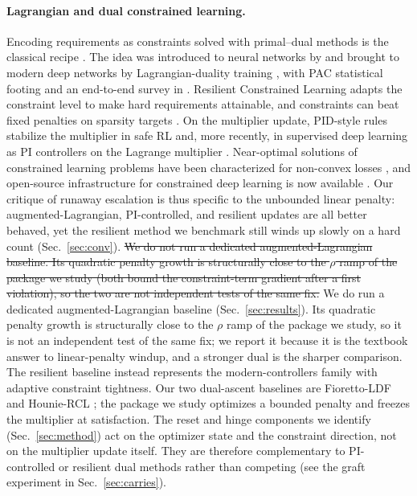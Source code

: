 \documentclass[10pt]{article}
\newcommand{\del}[1]{{\color{red}\sout{#1}}}
\begin{document}
\paragraph{Lagrangian and dual constrained learning.}
Encoding requirements as constraints solved with primal--dual methods is
the classical recipe \citep{bertsekas1982constrained}. The idea was
introduced to neural networks by \citet{platt1988constrained} and brought
to modern deep networks by Lagrangian-duality training
\citep{fioretto2020lagrangian}, with PAC statistical footing
\citep{chamon2020probably,chamon2022constrained} and an end-to-end survey
in \citet{kotary2021end}. Resilient Constrained Learning
\citep{hounie2023resilient} adapts the constraint level to make hard
requirements attainable, and constraints can beat fixed penalties on
sparsity targets \citep{gallego2022controlled}. On the multiplier update,
PID-style rules stabilize the multiplier in safe RL
\citep{stooke2020responsive} and, more recently, in supervised deep
learning as PI controllers on the Lagrange multiplier
\citep{sohrabi2024pi}. Near-optimal solutions of constrained learning
problems have been characterized for non-convex losses
\citep{elenter2024near}, and open-source infrastructure for constrained
deep learning is now available \citep{gallego2024cooper}. Our critique of
runaway escalation is thus specific to the unbounded linear penalty:
augmented-Lagrangian, PI-controlled, and resilient updates are all better
behaved, yet the resilient method we benchmark still winds up slowly on a
hard count (Sec.~\ref{sec:conv}). \del{We do not run a dedicated
augmented-Lagrangian baseline. Its quadratic penalty growth is
structurally close to the $\rho$ ramp of the package we study (both bound
the constraint-term gradient after a first violation), so the two are not
independent tests of the same fix.}
{\color{blue}We do run a dedicated augmented-Lagrangian baseline
\mbox{(Sec.~\ref{sec:results})}. Its quadratic penalty growth is structurally
close to the $\rho$ ramp of the package we study, so it is not an
independent test of the same fix; we report it because it is the textbook
answer to linear-penalty windup, and a stronger dual is the sharper
comparison.}
The resilient baseline instead
represents the modern-controllers family with adaptive constraint
tightness. Our two dual-ascent baselines are Fioretto-LDF
\citep{fioretto2020lagrangian} and Hounie-RCL \citep{hounie2023resilient};
the package we study optimizes a bounded penalty and freezes the
multiplier at satisfaction. The reset and hinge components we identify
(Sec.~\ref{sec:method}) act on the optimizer state and the constraint
direction, not on the multiplier update itself. They are therefore
complementary to PI-controlled or resilient dual methods rather than
competing (see the graft experiment in Sec.~\ref{sec:carries}).
\end{document}
